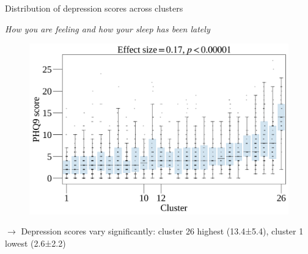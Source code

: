 \documentclass[10pt]{beamer}
\begin{document}
\begin{frame}{Distribution of depression scores across clusters}

  \textit{How you are feeling and how your sleep has been lately}%
  \begin{figure}
    \centering
    \includegraphics[scale=0.06]{img/topic_modeling/boxplot_description/popgen_description_larger_boxplots.png}
    \label{fig:popgen_description}
\end{figure}


\pause

$\rightarrow$ Depression scores vary significantly: cluster 26 highest (13.4±5.4), cluster 1 lowest (2.6±2.2)




\end{frame}
\end{document}
